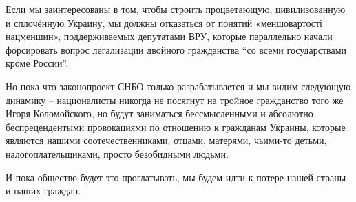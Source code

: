 Если мы заинтересованы в том, чтобы строить процветающую, цивилизованную и
сплочённую Украину, мы должны отказаться от понятий «меншовартості нацменшин»,
поддерживаемых депутатами ВРУ, которые параллельно начали форсировать вопрос
легализации двойного гражданства “со всеми государствами кроме России”. 

Но пока что законопроект СНБО только разрабатывается и мы видим следующую
динамику – националисты никогда не посягнут на тройное гражданство того же
Игоря Коломойского, но будут заниматься бессмысленными и абсолютно
беспрецендентыми провокациями по отношению к гражданам Украины, которые
являются нашими соотечественниками, отцами, матерями, чьими-то детьми,
налогоплательщиками, просто безобидными людьми. 

И пока общество будет это проглатывать, мы будем идти к потере нашей страны и
наших граждан.
